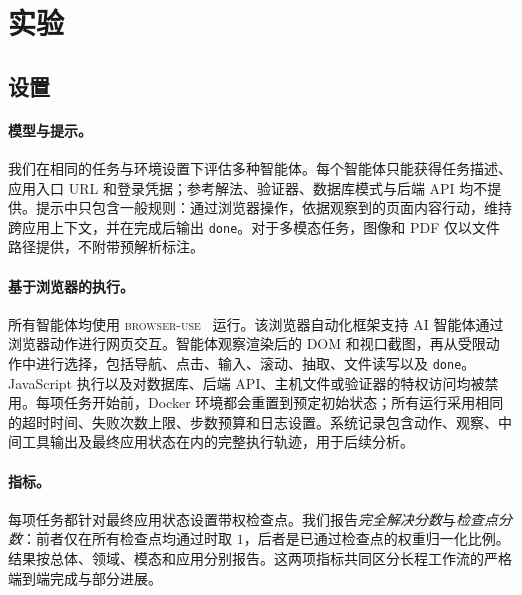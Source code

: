 \section{实验}
\label{exp}

\subsection{设置}
\label{exp-setup}

\paragraph{模型与提示。} 我们在相同的任务与环境设置下评估多种智能体。每个智能体只能获得任务描述、应用入口 URL 和登录凭据；参考解法、验证器、数据库模式与后端 API 均不提供。提示中只包含一般规则：通过浏览器操作，依据观察到的页面内容行动，维持跨应用上下文，并在完成后输出 \texttt{done}。对于多模态任务，图像和 PDF 仅以文件路径提供，不附带预解析标注。

\paragraph{基于浏览器的执行。} 所有智能体均使用 \textsc{browser-use}~\cite{browseruse} 运行。该浏览器自动化框架支持 AI 智能体通过浏览器动作进行网页交互。智能体观察渲染后的 DOM 和视口截图，再从受限动作中进行选择，包括导航、点击、输入、滚动、抽取、文件读写以及 \texttt{done}。JavaScript 执行以及对数据库、后端 API、主机文件或验证器的特权访问均被禁用。每项任务开始前，Docker 环境都会重置到预定初始状态；所有运行采用相同的超时时间、失败次数上限、步数预算和日志设置。系统记录包含动作、观察、中间工具输出及最终应用状态在内的完整执行轨迹，用于后续分析。

\paragraph{指标。} 每项任务都针对最终应用状态设置带权检查点。我们报告\emph{完全解决分数}与\emph{检查点分数}：前者仅在所有检查点均通过时取 $1$，后者是已通过检查点的权重归一化比例。结果按总体、领域、模态和应用分别报告。这两项指标共同区分长程工作流的严格端到端完成与部分进展。

